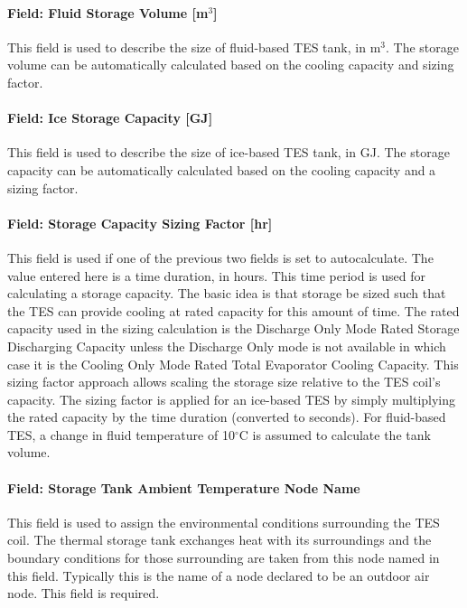 \paragraph{Field: Fluid Storage Volume {[}m\(^{3}\){]}}\label{field-fluid-storage-volume-m3}

This field is used to describe the size of fluid-based TES tank, in m\(^{3}\). The storage volume can be automatically calculated based on the cooling capacity and sizing factor.

\paragraph{Field: Ice Storage Capacity {[}GJ{]}}\label{field-ice-storage-capacity-gj}

This field is used to describe the size of ice-based TES tank, in GJ. The storage capacity can be automatically calculated based on the cooling capacity and a sizing factor.

\paragraph{Field: Storage Capacity Sizing Factor {[}hr{]}}\label{field-storage-capacity-sizing-factor-hr}

This field is used if one of the previous two fields is set to autocalculate. The value entered here is a time duration, in hours. This time period is used for calculating a storage capacity. The basic idea is that storage be sized such that the TES can provide cooling at rated capacity for this amount of time. The rated capacity used in the sizing calculation is the Discharge Only Mode Rated Storage Discharging Capacity unless the Discharge Only mode is not available in which case it is the Cooling Only Mode Rated Total Evaporator Cooling Capacity. This sizing factor approach allows scaling the storage size relative to the TES coil's capacity. The sizing factor is applied for an ice-based TES by simply multiplying the rated capacity by the time duration (converted to seconds). For fluid-based TES, a change in fluid temperature of 10$^\circ$C is assumed to calculate the tank volume.

\paragraph{Field: Storage Tank Ambient Temperature Node Name}\label{field-storage-tank-ambient-temperature-node-name}

This field is used to assign the environmental conditions surrounding the TES coil. The thermal storage tank exchanges heat with its surroundings and the boundary conditions for those surrounding are taken from this node named in this field. Typically this is the name of a node declared to be an outdoor air node. This field is required.

